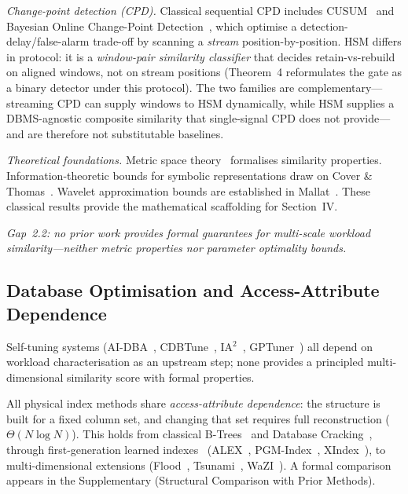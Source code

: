 \documentclass[10pt,journal,compsoc]{IEEEtran}
\begin{document}
\textit{Change-point detection (CPD).} Classical sequential CPD
includes CUSUM~\cite{Page1954CUSUM} and Bayesian Online Change-Point
Detection~\cite{AdamsMacKay2007BOCPD}, which optimise a
detection-delay/false-alarm trade-off by scanning a \emph{stream}
position-by-position. HSM differs in protocol: it is a
\emph{window-pair similarity classifier} that decides retain-vs-rebuild
on aligned windows, not on stream positions (Theorem~4 reformulates
the gate as a binary detector under this protocol). The two families
are complementary---streaming CPD can supply windows to HSM
dynamically, while HSM supplies a DBMS-agnostic composite similarity
that single-signal CPD does not provide---and are therefore not
substitutable baselines.

\textit{Theoretical foundations.} Metric space theory~\cite{Deza2009Distances}
formalises similarity properties. Information-theoretic bounds for
symbolic representations draw on Cover \& Thomas~\cite{Cover2006InfoTheory}.
Wavelet approximation bounds are established in Mallat~\cite{Mallat1989Wavelets}.
These classical results provide the mathematical scaffolding for Section~IV.

\emph{Gap~2.2: no prior work provides formal guarantees for multi-scale
workload similarity---neither metric properties nor parameter optimality bounds.}

\subsection{Database Optimisation and Access-Attribute Dependence}

Self-tuning systems (AI-DBA~\cite{Li2022AIDBA}, CDBTune~\cite{Zhang2019CDBTune},
IA$^2$~\cite{Xu2024IA2}, GPTuner~\cite{Lao2024GPTuner}) all depend on
workload characterisation as an upstream step; none provides a principled
multi-dimensional similarity score with formal properties.

All physical index methods share \emph{access-attribute dependence}:
the structure is built for a fixed column set, and changing that set
requires full reconstruction ($\Theta(N\log N)$). This holds from
classical B-Trees~\cite{Ramakrishnan2003DMS} and Database
Cracking~\cite{Idreos2011Cracking}, through first-generation
learned indexes~\cite{Kraska2018LearnedIndex} (ALEX~\cite{Ding2020ALEX},
PGM-Index~\cite{Ferragina2020PGM}, XIndex~\cite{Tang2020XIndex}),
to multi-dimensional extensions
(Flood~\cite{Nathan2020Flood}, Tsunami~\cite{Ding2020Tsunami},
WaZI~\cite{Pai2024WaZI}).
A formal comparison appears in the Supplementary
(Structural Comparison with Prior Methods).
\end{document}
